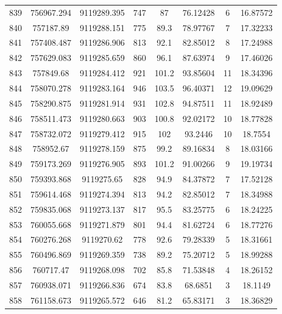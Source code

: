 \begin{longtable}{cccccccc}
839  & 756967.294      & 9119289.395      & 747     & 87    & 76.12428 & 6  & 16.87572 \\
840  & 757187.89       & 9119288.151      & 775     & 89.3  & 78.97767 & 7  & 17.32233 \\
841  & 757408.487      & 9119286.906      & 813     & 92.1  & 82.85012 & 8  & 17.24988 \\
842  & 757629.083      & 9119285.659      & 860     & 96.1  & 87.63974 & 9  & 17.46026 \\
843  & 757849.68       & 9119284.412      & 921     & 101.2 & 93.85604 & 11 & 18.34396 \\
844  & 758070.278      & 9119283.164      & 946     & 103.5 & 96.40371 & 12 & 19.09629 \\
845  & 758290.875      & 9119281.914      & 931     & 102.8 & 94.87511 & 11 & 18.92489 \\
846  & 758511.473      & 9119280.663      & 903     & 100.8 & 92.02172 & 10 & 18.77828 \\
847  & 758732.072      & 9119279.412      & 915     & 102   & 93.2446  & 10 & 18.7554  \\
848  & 758952.67       & 9119278.159      & 875     & 99.2  & 89.16834 & 8  & 18.03166 \\
849  & 759173.269      & 9119276.905      & 893     & 101.2 & 91.00266 & 9  & 19.19734 \\
850  & 759393.868      & 9119275.65       & 828     & 94.9  & 84.37872 & 7  & 17.52128 \\
851  & 759614.468      & 9119274.394      & 813     & 94.2  & 82.85012 & 7  & 18.34988 \\
852  & 759835.068      & 9119273.137      & 817     & 95.5  & 83.25775 & 6  & 18.24225 \\
853  & 760055.668      & 9119271.879      & 801     & 94.4  & 81.62724 & 6  & 18.77276 \\
854  & 760276.268      & 9119270.62       & 778     & 92.6  & 79.28339 & 5  & 18.31661 \\
855  & 760496.869      & 9119269.359      & 738     & 89.2  & 75.20712 & 5  & 18.99288 \\
856  & 760717.47       & 9119268.098      & 702     & 85.8  & 71.53848 & 4  & 18.26152 \\
857  & 760938.071      & 9119266.836      & 674     & 83.8  & 68.6851  & 3  & 18.1149  \\
858  & 761158.673      & 9119265.572      & 646     & 81.2  & 65.83171 & 3  & 18.36829 \\

\end{longtable}
